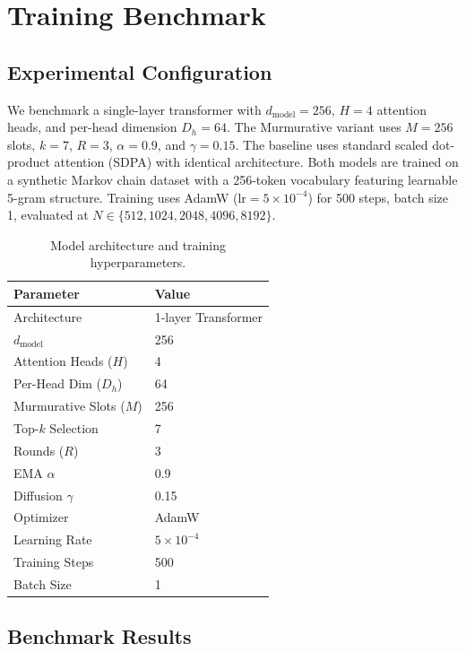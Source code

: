 \documentclass{article}
\begin{document}
\section{Training Benchmark}

\subsection{Experimental Configuration}

We benchmark a single-layer transformer with $d_{\mathrm{model}} = 256$, $H = 4$ attention heads, and per-head dimension $D_h = 64$. The Murmurative variant uses $M = 256$ slots, $k = 7$, $R = 3$, $\alpha = 0.9$, and $\gamma = 0.15$. The baseline uses standard scaled dot-product attention (SDPA) with identical architecture. Both models are trained on a synthetic Markov chain dataset with a 256-token vocabulary featuring learnable 5-gram structure. Training uses AdamW ($\mathrm{lr} = 5 \times 10^{-4}$) for 500 steps, batch size 1, evaluated at $N \in \{512, 1024, 2048, 4096, 8192\}$.

\begin{table}[H]
\centering
\caption{Model architecture and training hyperparameters.}
\label{tab:config}
\begin{tabular}{@{}ll@{}}
\toprule
\textbf{Parameter} & \textbf{Value} \\
\midrule
Architecture    & 1-layer Transformer \\
$d_{\mathrm{model}}$ & 256 \\
Attention Heads ($H$) & 4 \\
Per-Head Dim ($D_h$) & 64 \\
Murmurative Slots ($M$) & 256 \\
Top-$k$ Selection & 7 \\
Rounds ($R$) & 3 \\
EMA $\alpha$ & 0.9 \\
Diffusion $\gamma$ & 0.15 \\
Optimizer & AdamW \\
Learning Rate & $5 \times 10^{-4}$ \\
Training Steps & 500 \\
Batch Size & 1 \\
\bottomrule
\end{tabular}
\end{table}

\subsection{Benchmark Results}
\end{document}
